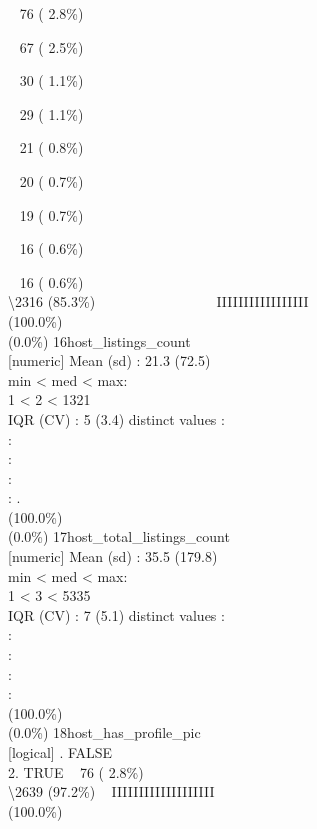 \documentclass[
  journal,
]{IEEEtran}%
\begin{document}
\strut ~ 76 ( 2.8\%)\\
\strut ~ 67 ( 2.5\%)\\
\strut ~ 30 ( 1.1\%)\\
\strut ~ 29 ( 1.1\%)\\
\strut ~ 21 ( 0.8\%)\\
\strut ~ 20 ( 0.7\%)\\
\strut ~ 19 ( 0.7\%)\\
\strut ~ 16 ( 0.6\%)\\
\strut ~ 16 ( 0.6\%)\\
\textbackslash2316 (85.3\%) \textbar{} \textbar~ ~ ~ ~ ~ ~ ~ ~ ~ ~
IIIIIIIIIIIIIIIII \\
(100.0\%) \\
(0.0\%) \textbar{} \textbar{} 16\textbar host\_listings\_count\\
{[}numeric{]} \textbar Mean (sd) : 21.3 (72.5)\\
min \textless{} med \textless{} max:\\
1 \textless{} 2 \textless{} 1321\\
IQR (CV) : 5 (3.4)  distinct values \textbar{} \textbar:\\
:\\
:\\
:\\
: . \\
(100.0\%) \\
(0.0\%) \textbar{} \textbar{} 17\textbar host\_total\_listings\_count\\
{[}numeric{]} \textbar Mean (sd) : 35.5 (179.8)\\
min \textless{} med \textless{} max:\\
1 \textless{} 3 \textless{} 5335\\
IQR (CV) : 7 (5.1)  distinct values \textbar{} \textbar:\\
:\\
:\\
:\\
: \\
(100.0\%) \\
(0.0\%) \textbar{} \textbar{} 18\textbar host\_has\_profile\_pic\\
{[}logical{]} . FALSE\\
2. TRUE \textbar~ 76 ( 2.8\%)\\
\textbackslash2639 (97.2\%) \textbar{} \textbar~ IIIIIIIIIIIIIIIIIII
\\
(100.0\%) \\
\end{document}

